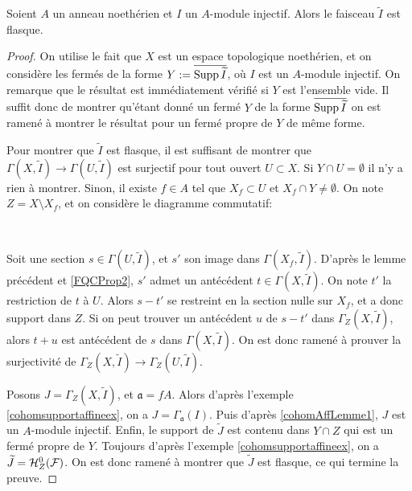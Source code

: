 \begin{prop}\label{cohomAffProp1}
Soient $A$ un anneau noethérien et $I$ un $A$-module injectif. Alors le faisceau $\widetilde{I}$ est flasque.
\end{prop}
\begin{proof}
On utilise le fait que $X$ est un espace topologique noethérien, et on considère les fermés de la forme $Y:=\overline{\operatorname{Supp} \widetilde{I}}$, où $I$ est un $A$-module injectif. On remarque que le résultat est immédiatement vérifié si $Y$ est l'ensemble vide. Il suffit donc de montrer qu'étant donné un fermé $Y$ de la forme $\overline{\operatorname{Supp} \widetilde{I}}$ on est ramené à montrer le résultat pour un fermé propre de $Y$ de même forme.

Pour montrer que $\widetilde{I}$ est flasque, il est suffisant de montrer que $\Gamma(X,\widetilde{I})\rightarrow\Gamma(U,\widetilde{I})$ est surjectif pour tout ouvert $U\subset X$. Si $Y\cap U=\emptyset$ il n'y a rien à montrer. Sinon, il existe $f\in A$ tel que $X_f\subset U$ et $X_f\cap Y\neq \emptyset$. On note $Z= X\setminus X_f$, et on considère le diagramme commutatif:

	\begin{center}
	\\
	\end{center}
Soit une section $s\in\Gamma(U,\widetilde{I})$, et $s'$ son image dans $\Gamma(X_f,\widetilde{I})$. D'après le lemme précédent et \ref{FQCProp2}, $s'$ admet un antécédent $t\in \Gamma(X,\widetilde{I})$. On note $t'$ la restriction de $t$ à $U$. Alors $s-t'$ se restreint en la section nulle sur $X_f$, et a donc support dans $Z$. Si on peut trouver un antécédent $u$ de $s-t'$ dans $\Gamma_Z(X,\widetilde{I})$, alors $t+u$ est antécédent de $s$ dans $\Gamma(X,\widetilde{I})$. On est donc ramené à prouver la surjectivité de $\Gamma_Z(X,\widetilde{I})\rightarrow\Gamma_Z(U,\widetilde{I})$.

Posons $J=\Gamma_Z(X,\widetilde{I})$, et $\mathfrak{a}=fA$. Alors d'après l'exemple \ref{cohomsupportaffineex}, on a $J=\Gamma_\mathfrak{a}(I)$. Puis d'après \ref{cohomAffLemme1}, $J$ est un $A$-module injectif. Enfin, le support de $\widetilde{J}$ est contenu dans $Y\cap Z$ qui est un fermé propre de $Y$.  Toujours d'après l'exemple \ref{cohomsupportaffineex}, on a $\widetilde{J} = \mathcal{H} ^0 _Z(\mathcal{F})$. On est donc ramené à montrer que $\widetilde{J}$ est flasque, ce qui termine la preuve.
\end{proof}


